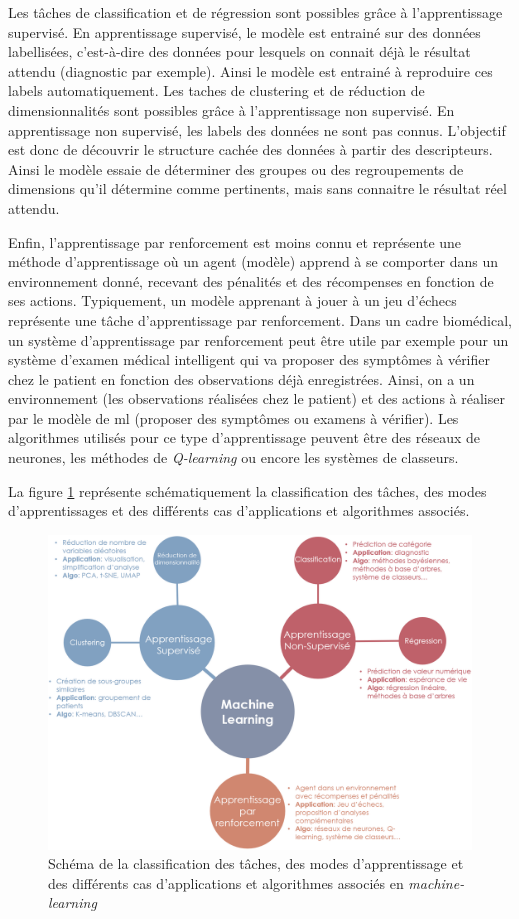 Les tâches de classification et de régression sont possibles grâce à l'apprentissage supervisé. En apprentissage supervisé, le modèle est entrainé sur des données labellisées, c'est-à-dire des données pour lesquels on connait déjà le résultat attendu (diagnostic par exemple). Ainsi le modèle est entrainé à reproduire ces labels automatiquement.
Les taches de clustering et de réduction de dimensionnalités sont possibles grâce à l'apprentissage non supervisé. En apprentissage non supervisé, les labels des données ne sont pas connus. L'objectif est donc de découvrir le structure cachée des données à partir des descripteurs. Ainsi le modèle essaie de déterminer des groupes ou des regroupements de dimensions qu'il détermine comme pertinents, mais sans connaitre le résultat réel attendu.

Enfin, l'apprentissage par renforcement est moins connu et représente une méthode d'apprentissage où un agent (modèle) apprend à se comporter dans un environnement donné, recevant des pénalités et des récompenses en fonction de ses actions. Typiquement,  un modèle apprenant à jouer à un jeu d'échecs représente une tâche d'apprentissage par renforcement. Dans un cadre biomédical, un système d'apprentissage par renforcement peut être utile par exemple pour un système d'examen médical intelligent qui va proposer des symptômes à vérifier chez le patient en fonction des observations déjà enregistrées. Ainsi, on a un environnement (les observations réalisées chez le patient) et des actions à réaliser par le modèle de \gls{ml} (proposer des symptômes ou examens à vérifier). Les algorithmes utilisés pour ce type d'apprentissage peuvent être des réseaux de neurones, les méthodes de \textit{Q-learning} ou encore les systèmes de classeurs.

La figure \ref{fig:ml-landscape} représente schématiquement la classification des tâches, des modes d'apprentissages et des différents cas d'applications et algorithmes associés.
\begin{figure}[!ht]
 \centering
 \includegraphics[width=1\textwidth]{figures/ml_landscape.png}
 \caption[Schéma des méthodes de machine-learning]{Schéma de la classification des tâches, des modes d'apprentissage et des différents cas d'applications et algorithmes associés en \textit{machine-learning}}
 \label{fig:ml-landscape}
\end{figure}

